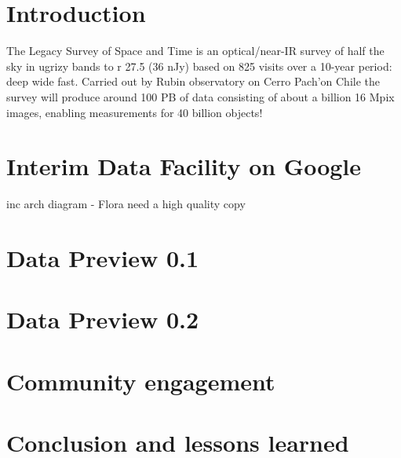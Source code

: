 \section{Introduction}

The Legacy Survey of Space and Time is an optical/near-IR survey of half the sky in ugrizy bands to r 27.5 (36 nJy) based on 825 visits over a 10-year period: deep wide fast.
Carried out by Rubin observatory on Cerro Pach'on Chile the survey will produce around 100 PB of data consisting of about a billion 16 Mpix images, enabling measurements for 40 billion objects! \cite{arXiv:0805.2366}



\section{Interim Data Facility on Google }
inc arch diagram - Flora need a high quality copy

\section{Data Preview 0.1}


\section{Data Preview 0.2}

\section{Community engagement }

\section{Conclusion and lessons learned}



